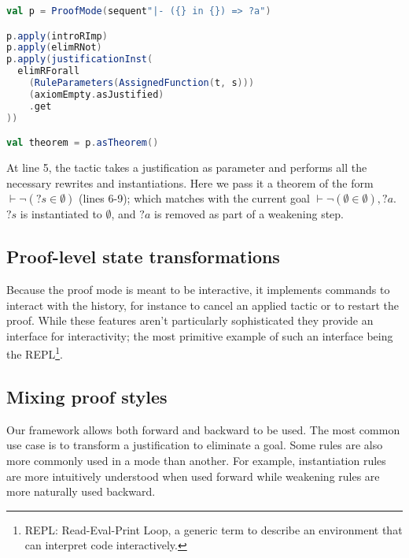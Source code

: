 \begin{lstlisting}[language=Scala,caption={[Proof with justifications]{Example of a proof with justifications.}},label={lst:proof-justifications},captionpos=b]
val p = ProofMode(sequent"|- ({} in {}) => ?a")

p.apply(introRImp)
p.apply(elimRNot)
p.apply(justificationInst(
  elimRForall
    (RuleParameters(AssignedFunction(t, s)))
    (axiomEmpty.asJustified)
    .get
))

val theorem = p.asTheorem()
\end{lstlisting}

At line 5, the tactic  takes a justification as parameter and performs all the necessary rewrites and instantiations. Here we pass it a theorem of the form $\vdash \neg({?s} \in \emptyset)$ (lines 6-9); which matches with the current goal $\vdash \neg(\emptyset \in \emptyset), {?a}$. ${?s}$ is instantiated to $\emptyset$, and ${?a}$ is removed as part of a weakening step.

\subsection{Proof-level state transformations}

Because the proof mode is meant to be interactive, it implements commands to interact with the history, for instance to cancel an applied tactic or to restart the proof. While these features aren't particularly sophisticated they provide an interface for interactivity; the most primitive example of such an interface being the REPL\footnote{REPL: Read-Eval-Print Loop, a generic term to describe an environment that can interpret code interactively.}.

\subsection{Mixing proof styles}

Our framework allows both forward and backward to be used. The most common use case is to transform a justification to eliminate a goal. Some rules are also more commonly used in a mode than another. For example, instantiation rules are more intuitively understood when used forward while weakening rules are more naturally used backward.

